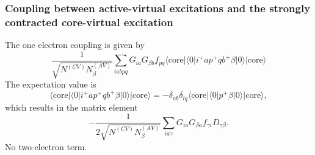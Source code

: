 \documentclass[a4paper,oneside,11pt]{article}
\numberwithin{equation}{section}
\newcommand{\DMETBra}{\langle \mathrm{core}|\langle 0|}
\newcommand{\DMETKet}{|0\rangle| \mathrm{core} \rangle}
\begin{document}
\subsubsection{Coupling between active-virtual excitations and the strongly contracted core-virtual excitation}
The one electron coupling is given by
\begin{equation}
\frac{1}{\sqrt{N^{(CV)}N^{(AV)}_{\beta}}} \sum_{iabpq} G_{ia} G_{\beta b} f_{pq} \DMETBra i^{+} a p^{+} q b^{+} \beta \DMETKet
\end{equation}
The expectation value is
\begin{equation}
\DMETBra i^{+} a p^{+} q b^{+} \beta \DMETKet = -\delta_{ab} \delta_{iq} \DMETBra p^{+} \beta \DMETKet   ,
\end{equation}
which results in the matrix element
\begin{equation}
-\frac{1}{2 \sqrt{N^{(CV)}N^{(AV)}_{\beta}}} \sum_{ia \gamma} G_{ia} G_{\beta a} f_{\gamma i} D_{\gamma \beta} .
\end{equation}
No two-electron term.
\end{document}
